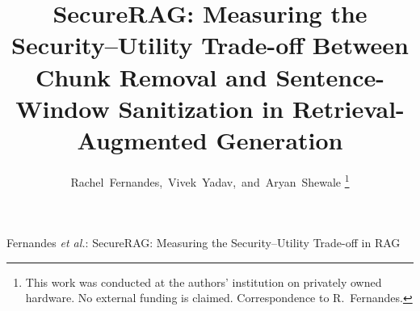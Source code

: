 \documentclass[journal]{IEEEtran}
\begin{document}
\title{SecureRAG: Measuring the Security--Utility Trade-off Between Chunk
  Removal and Sentence-Window Sanitization in Retrieval-Augmented Generation}

\author{Rachel~Fernandes,~Vivek~Yadav,~and~Aryan~Shewale%
  \thanks{This work was conducted at the authors' institution on privately owned
    hardware. No external funding is claimed.
    Correspondence to R.~Fernandes.}%
}

%
{Fernandes \MakeLowercase{\textit{et al.}}: SecureRAG: Measuring the
 Security--Utility Trade-off in RAG}

\maketitle
\end{document}
